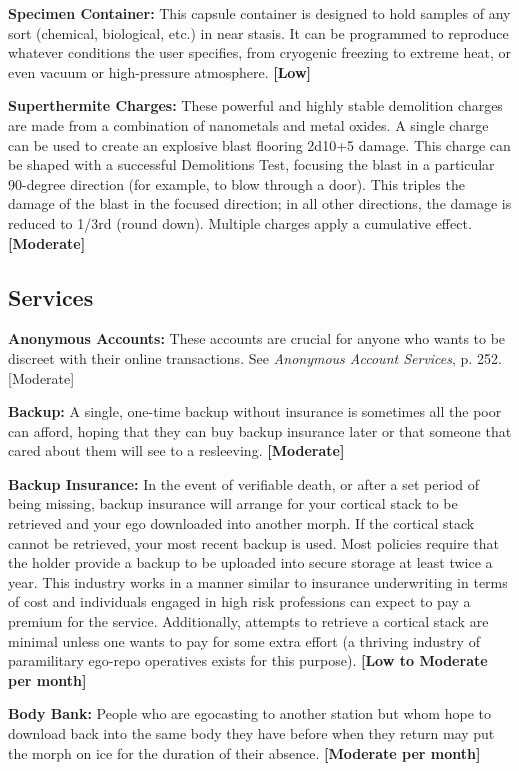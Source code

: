\textbf{Specimen Container:} This capsule container is designed to hold samples of any sort (chemical, biological, etc.) in near stasis. It can be programmed to reproduce whatever conditions the user specifies, from cryogenic freezing to extreme heat, or even vacuum or high-pressure atmosphere. \textbf{[Low]} 

\textbf{Superthermite Charges:} These powerful and highly stable demolition charges are made from a combination of nanometals and metal oxides. A single charge can be used to create an explosive blast flooring 2d10+5 damage. This charge can be shaped with a successful Demolitions Test, focusing the blast in a particular 90-degree direction (for example, to blow through a door). This triples the damage of the blast in the focused direction; in all other directions, the damage is reduced to 1/3rd (round down). Multiple charges apply a cumulative effect. \textbf{[Moderate]} 

\subsection{Services} \label{sec:services} 

\textbf{Anonymous Accounts:} These accounts are crucial for anyone who wants to be discreet with their online transactions. See \emph{Anonymous Account Services}, p. 252. [Moderate] 

\textbf{Backup:} A single, one-time backup without insurance is sometimes all the poor can afford, hoping that they can buy backup insurance later or that someone that cared about them will see to a resleeving. \textbf{[Moderate]} 

\textbf{Backup Insurance:} In the event of verifiable death, or after a set period of being missing, backup insurance will arrange for your cortical stack to be retrieved and your ego downloaded into another morph. If the cortical stack cannot be retrieved, your most recent backup is used. Most policies require that the holder provide a backup to be uploaded into secure storage at least twice a year. This industry works in a manner similar to insurance underwriting in terms of cost and individuals engaged in high risk professions can expect to pay a premium for the service. Additionally, attempts to retrieve a cortical stack are minimal unless one wants to pay for some extra effort (a thriving industry of paramilitary ego-repo operatives exists for this purpose). \textbf{[Low to Moderate per month]} 

\textbf{Body Bank:} People who are egocasting to another station but whom hope to download back into the same body they have before when they return may put the morph on ice for the duration of their absence. \textbf{[Moderate per month]} 

